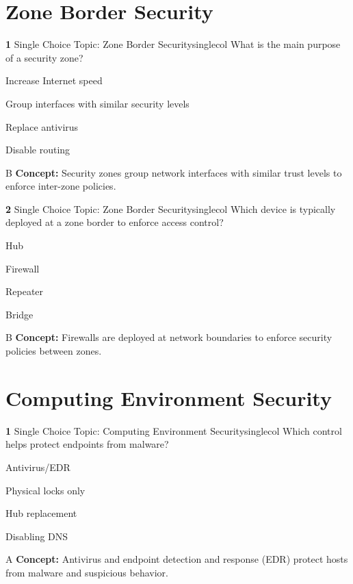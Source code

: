 \documentclass[10pt,a4paper]{article}
\begin{document}
\section{Zone Border Security}
\begin{qcard}{\color{white}\textbf{1} \hfill \small Single Choice \textbar{} Topic: Zone Border Security}{singlecol}
What is the main purpose of a security zone?

\begin{qoptions}
\item Increase Internet speed
\item Group interfaces with similar security levels
\item Replace antivirus
\item Disable routing
\end{qoptions}
\begin{explainbox}{B}
\textbf{Concept:} Security zones group network interfaces with similar trust levels to enforce inter-zone policies.
\end{explainbox}
\end{qcard}

\begin{qcard}{\color{white}\textbf{2} \hfill \small Single Choice \textbar{} Topic: Zone Border Security}{singlecol}
Which device is typically deployed at a zone border to enforce access control?

\begin{qoptions}
\item Hub
\item Firewall
\item Repeater
\item Bridge
\end{qoptions}
\begin{explainbox}{B}
\textbf{Concept:} Firewalls are deployed at network boundaries to enforce security policies between zones.
\end{explainbox}
\end{qcard}

\section{Computing Environment Security}
\begin{qcard}{\color{white}\textbf{1} \hfill \small Single Choice \textbar{} Topic: Computing Environment Security}{singlecol}
Which control helps protect endpoints from malware?

\begin{qoptions}
\item Antivirus/EDR
\item Physical locks only
\item Hub replacement
\item Disabling DNS
\end{qoptions}
\begin{explainbox}{A}
\textbf{Concept:} Antivirus and endpoint detection and response (EDR) protect hosts from malware and suspicious behavior.
\end{explainbox}
\end{qcard}
\end{document}
